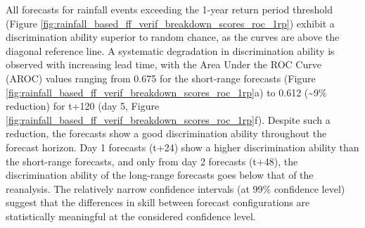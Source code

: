 All forecasts for rainfall events exceeding the 1-year return period threshold (Figure \ref{fig:rainfall_based_ff_verif_breakdown_scores_roc_1rp}) exhibit a discrimination ability superior to random chance, as the curves are above the diagonal reference line. A systematic degradation in discrimination ability is observed with increasing lead time, with the Area Under the ROC Curve (AROC) values ranging from 0.675 for the short-range forecasts (Figure \ref{fig:rainfall_based_ff_verif_breakdown_scores_roc_1rp}a) to 0.612 (\sim9\% reduction) for t+120 (day 5, Figure \ref{fig:rainfall_based_ff_verif_breakdown_scores_roc_1rp}f). Despite such a reduction, the forecasts show a good discrimination ability throughout the forecast horizon. Day 1 forecasts (t+24) show a higher discrimination ability than the short-range forecasts, and only from day 2 forecasts (t+48), the discrimination ability of the long-range forecasts goes below that of the reanalysis. The relatively narrow confidence intervals (at 99\% confidence level) suggest that the differences in skill between forecast configurations are statistically meaningful at the considered confidence level.

